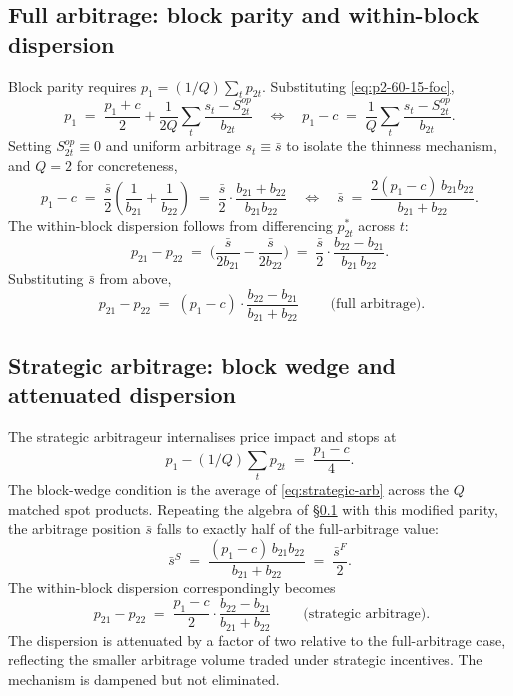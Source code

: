 \documentclass[11pt]{article}
\begin{document}
\subsection{Full arbitrage: block parity and within-block dispersion}\label{app:60-15:full}
Block parity requires $p_1 = (1/Q) \sum_t p_{2t}$. Substituting \eqref{eq:p2-60-15-foc},
\[
p_1 \;=\; \frac{p_1 + c}{2} + \frac{1}{2 Q}\!\sum_t\!\frac{s_t - S^{op}_{2t}}{b_{2t}}
\quad\Longleftrightarrow\quad
p_1 - c \;=\; \frac{1}{Q}\!\sum_t\!\frac{s_t - S^{op}_{2t}}{b_{2t}}.
\]
Setting $S^{op}_{2t} \equiv 0$ and uniform arbitrage $s_t \equiv \bar s$ to isolate the thinness mechanism, and $Q = 2$ for concreteness,
\[
p_1 - c \;=\; \frac{\bar s}{2}\!\left(\frac{1}{b_{21}} + \frac{1}{b_{22}}\right) \;=\; \frac{\bar s}{2}\cdot\frac{b_{21}+b_{22}}{b_{21} b_{22}}
\quad\Longleftrightarrow\quad
\bar s \;=\; \frac{2(p_1 - c)\, b_{21} b_{22}}{b_{21} + b_{22}}.
\]
The within-block dispersion follows from differencing $p_{2t}^*$ across $t$:
\[
p_{21} - p_{22} \;=\; \bigg(\frac{\bar s}{2 b_{21}} - \frac{\bar s}{2 b_{22}}\bigg) \;=\; \frac{\bar s}{2}\cdot\frac{b_{22} - b_{21}}{b_{21}\, b_{22}}.
\]
Substituting $\bar s$ from above,
\begin{equation}
\boxed{\;p_{21} - p_{22} \;=\; (p_1 - c)\cdot \frac{b_{22} - b_{21}}{b_{21} + b_{22}}\;}\qquad\text{(full arbitrage)}.
\label{eq:within-block-full}
\end{equation}

\subsection{Strategic arbitrage: block wedge and attenuated dispersion}\label{app:60-15:strategic}
The strategic arbitrageur internalises price impact and stops at
\[
p_1 - (1/Q)\sum_t p_{2t} \;=\; \frac{p_1 - c}{4}.
\]
The block-wedge condition is the average of \eqref{eq:strategic-arb} across the $Q$ matched spot products. Repeating the algebra of \S\ref{app:60-15:full} with this modified parity, the arbitrage position $\bar s$ falls to exactly half of the full-arbitrage value:
\[
\bar s^{S} \;=\; \frac{(p_1 - c)\, b_{21} b_{22}}{b_{21} + b_{22}} \;=\; \frac{\bar s^{F}}{2}.
\]
The within-block dispersion correspondingly becomes
\begin{equation}
\boxed{\;p_{21} - p_{22} \;=\; \frac{p_1 - c}{2}\cdot\frac{b_{22} - b_{21}}{b_{21} + b_{22}}\;}\qquad\text{(strategic arbitrage)}.
\label{eq:within-block-strategic}
\end{equation}
The dispersion is attenuated by a factor of two relative to the full-arbitrage case, reflecting the smaller arbitrage volume traded under strategic incentives. The mechanism is dampened but not eliminated.
\end{document}
